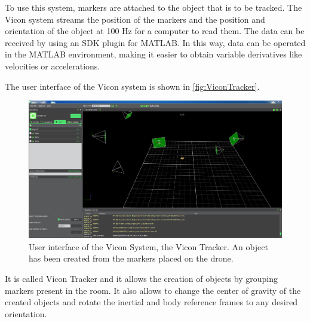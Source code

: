 
To use this system, markers are attached to the object that is to be tracked. The Vicon system streams the position of the markers and the position and orientation of the object at 100 Hz for a computer to read them. The data can be received by using an SDK plugin for MATLAB. In this way, data can be operated in the MATLAB environment, making it easier to obtain variable derivatives like velocities or accelerations.

The user interface of the Vicon system is shown in \autoref{fig:ViconTracker}. 
\begin{figure}[H]
	\centering
	\includegraphics[scale=0.27]{figures/ViconTracker}
	\caption{User interface of the Vicon System, the Vicon Tracker. An object has been created from the markers placed on the drone.}
	\label{fig:ViconTracker}
\end{figure}
It is called Vicon Tracker and it allows the creation of objects by grouping markers present in the room. It also allows to change the center of gravity of the created objects and rotate the inertial and body reference frames to any desired orientation.
